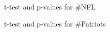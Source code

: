 \documentclass{article}
\begin{document}
\begin{figure}
\centering
{}
\caption{t-test and p-values for \#NFL} \label{Q3_3}
\end{figure}

\begin{figure}
\centering
{}
\caption{t-test and p-values for \#Patriots} \label{Q3_4}
\end{figure}
\end{document}
